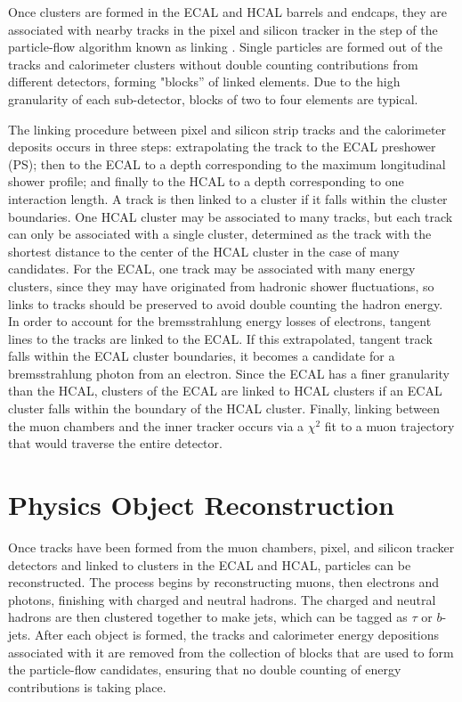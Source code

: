\par Once clusters are formed in the ECAL and HCAL barrels and
endcaps, they are associated with nearby tracks in the pixel and
silicon tracker in the step of the particle-flow algorithm known as
linking \cite{CMS-PAS-PFT-09-001}.  Single particles are formed out of
the tracks and calorimeter clusters without double counting
contributions from different detectors, forming "blocks'' of linked
elements.  Due to the high granularity of each sub-detector, blocks of
two to four elements are typical.  

\par The linking procedure between pixel and silicon strip tracks and
the calorimeter deposits occurs in three steps: extrapolating the
track to the ECAL preshower (PS); then to the ECAL to a depth
corresponding to the maximum longitudinal shower profile; and finally
to the HCAL to a depth corresponding to one interaction length.  A
track is then linked to a cluster if it falls within the cluster
boundaries.  One HCAL cluster may be associated to many tracks, but
each track can only be associated with a single cluster, determined as
the track with the shortest distance to the center of the HCAL cluster
in the case of many candidates.  For the ECAL, one track may be
associated with many energy clusters, since they may have originated
from hadronic shower fluctuations, so links to tracks should be
preserved to avoid double counting the hadron energy.  In order to
account for the bremsstrahlung energy losses of electrons, tangent
lines to the tracks are linked to the ECAL.  If this extrapolated,
tangent track falls within the ECAL cluster boundaries, it becomes a
candidate for a bremsstrahlung photon from an electron.  Since the
ECAL has a finer granularity than the HCAL, clusters of the ECAL are
linked to HCAL clusters if an ECAL cluster falls within the boundary
of the HCAL cluster.   Finally, linking between the muon chambers and
the inner tracker occurs via a $\chi^{2}$ fit to a muon trajectory
that would traverse the entire detector.    

\section{Physics Object Reconstruction}
\label{physics_object_recostruction}

\par Once tracks have been formed from the muon chambers, pixel, and
silicon tracker detectors and linked to clusters in the ECAL and HCAL,
particles can be reconstructed.  The process begins by reconstructing
muons, then electrons and photons, finishing with charged and neutral
hadrons.  The charged and neutral hadrons are then clustered together to
make jets, which can be tagged as $\tau$ or $b$-jets.  After each
object is formed, the tracks and calorimeter energy depositions
associated with it are removed from the collection of blocks that are
used to form the particle-flow candidates, ensuring that no double
counting of energy contributions is taking place.  

